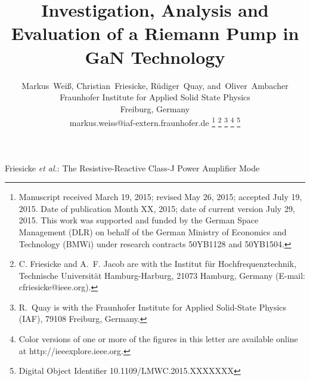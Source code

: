 \documentclass[journal]{IEEEtran}
\begin{document}
\title{Investigation, Analysis and Evaluation of a Riemann Pump in GaN Technology}
\author{%
	Markus~Wei\ss{},
    Christian~Friesicke,
    R\"{u}diger~Quay,
    and~Oliver~Ambacher\\
    Fraunhofer Institute for Applied Solid State Physics\\
    Freiburg, Germany\\
    markus.weiss@iaf-extern.fraunhofer.de%
    \thanks{%
      Manuscript received March 19, 2015;
      revised May 26, 2015;
      accepted July 19, 2015.
      Date of publication Month XX, 2015;
      date of current version July 29, 2015.
      This work was supported and funded by the German Space Management
      (DLR) on behalf of the German Ministry of Economics and Technology (BMWi)
      under research contracts 50YB1128 and 50YB1504.%
    }%
    \thanks{
      C. Friesicke and A.~F. Jacob are with the Institut f\"{u}r
      Hochfrequenztechnik, Technische Universit\"{a}t Hamburg-Harburg, 21073
      Hamburg, Germany (E-mail: cfriesicke@ieee.org).%
    }%
    \thanks{R.~Quay is with the Fraunhofer Institute for Applied Solid-State
      Physics (IAF), 79108 Freiburg, Germany.%
    }%
    \thanks{%
      Color versions of one or more of the figures in this letter are available
      online at http://ieeexplore.ieee.org.}
    \thanks{%
      Digital Object Identifier 10.1109/LMWC.2015.XXXXXXX%
    }%
}

%
         {Friesicke \MakeLowercase{\textit{et al.}}:
          The Resistive-Reactive Class-J Power Amplifier Mode}

\maketitle


\end{document}
